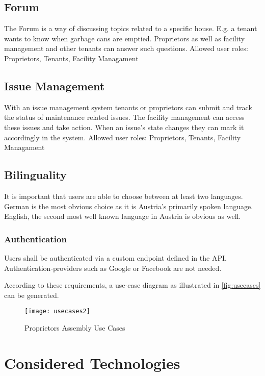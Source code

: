 \subsection{Forum}
The Forum is a way of discussing topics related to a specific house. E.g. a tenant wants to know when garbage cans are emptied. Proprietors as well as facility management and other tenants can answer such questions. \newline
Allowed user roles: Proprietors, Tenants, Facility Managament

\subsection{Issue Management}
With an issue management system tenants or proprietors can submit and track the status of maintenance related issues. The facility management can access these issues and take action. When an issue's state changes they can mark it accordingly in the system. \newline
Allowed user roles: Proprietors, Tenants, Facility Managament

\subsection{Bilinguality}
It is important that users are able to choose between at least two languages. German is the most obvious choice as it is Austria's primarily spoken language. English, the second most well known language in Austria is obvious as well.

\subsubsection{Authentication}
Users shall be authenticated via a custom endpoint defined in the API. Authentication-providers such as Google or Facebook are not needed. \newline

According to these requirements, a use-case diagram as illustrated in \autoref{fig:usecases} can be generated.
\begin{figure}[H]
    \begin{center}
    \texttt{[image: usecases2]}
    \end{center}
    \caption{Proprietors Assembly Use Cases}
    \label{fig:usecases}
\end{figure}

\section{Considered Technologies}
